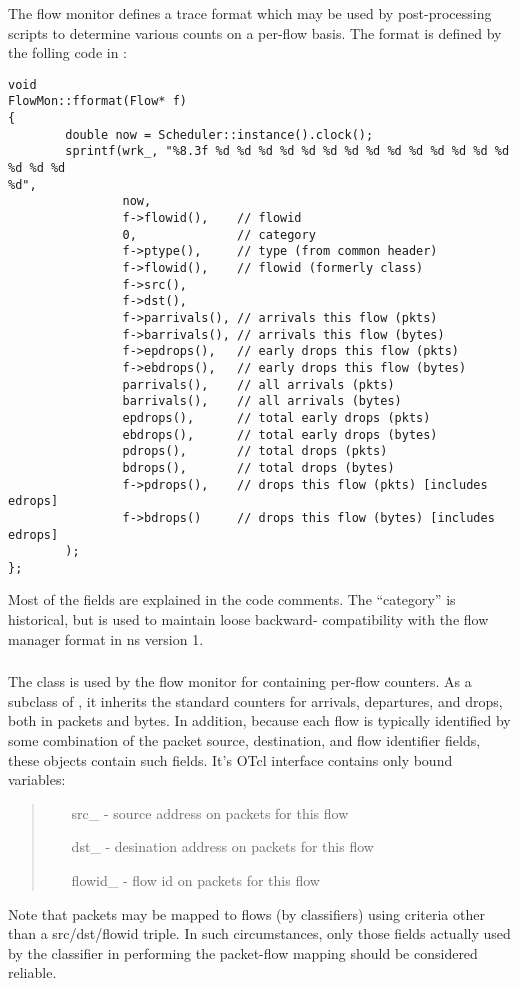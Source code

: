 The flow monitor defines a trace format which may be used by post-processing
scripts to determine various counts on a per-flow basis.
The format is defined by the folling code in :
\begin{small}
\begin{verbatim}
void
FlowMon::fformat(Flow* f)
{   
        double now = Scheduler::instance().clock();
        sprintf(wrk_, "%8.3f %d %d %d %d %d %d %d %d %d %d %d %d %d %d %d %d %d 
%d", 
                now,    
                f->flowid(),    // flowid
                0,              // category
                f->ptype(),     // type (from common header) 
                f->flowid(),    // flowid (formerly class)
                f->src(),
                f->dst(),
                f->parrivals(), // arrivals this flow (pkts)
                f->barrivals(), // arrivals this flow (bytes) 
                f->epdrops(),   // early drops this flow (pkts)
                f->ebdrops(),   // early drops this flow (bytes) 
                parrivals(),    // all arrivals (pkts)
                barrivals(),    // all arrivals (bytes) 
                epdrops(),      // total early drops (pkts)
                ebdrops(),      // total early drops (bytes) 
                pdrops(),       // total drops (pkts)
                bdrops(),       // total drops (bytes) 
                f->pdrops(),    // drops this flow (pkts) [includes edrops] 
                f->bdrops()     // drops this flow (bytes) [includes edrops]
        );
};  
\end{verbatim}
\end{small}

Most of the fields are explained in the code comments.
The ``category'' is historical, but is used to maintain loose backward-
compatibility with the flow manager format in ns version 1.

\subsubsection{}

The class  is used by the flow monitor
for containing per-flow counters.
As a subclass of , it inherits the standard
counters for arrivals, departures, and drops, both in packets and
bytes.
In addition, because each flow is typically identified by
some combination of the packet source, destination, and flow
identifier fields, these objects contain such fields.
It's OTcl interface contains only bound variables:
\begin{quote}
\begin{itemize}
	\item[src\_] - source address on packets for this flow
	\item[dst\_] - desination address on packets for this flow
	\item[flowid\_] - flow id on packets for this flow
\end{itemize}
\end{quote}

Note that packets may be mapped to flows (by classifiers) using
criteria other than a src/dst/flowid triple.
In such circumstances, only those fields actually used by
the classifier in performing the packet-flow mapping should be
considered reliable.
